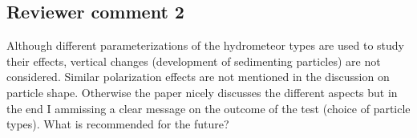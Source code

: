 %
%
%

\subsection*{Reviewer comment 2}

Although different parameterizations of the hydrometeor types are used to
study their effects, vertical changes (development of sedimenting particles)
are not considered. Similar polarization effects are not mentioned in the
discussion on particle shape. Otherwise the paper nicely discusses the different
aspects but in the end I ammissing a clear message on the outcome of the test
(choice of particle types). What is recommended for the future?

